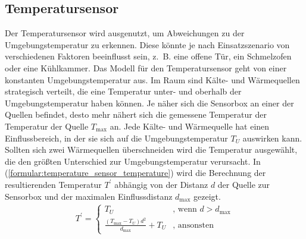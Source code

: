 \subsection{Temperatursensor}
Der Temperatursensor wird ausgenutzt, um Abweichungen zu der Umgebungstemperatur zu erkennen.
Diese könnte je nach Einsatzszenario von verschiedenen Faktoren beeinflusst sein, z.~B. eine offene Tür, ein Schmelzofen oder eine Kühlkammer.
\newline
\newline
Das Modell für den Temperatursensor geht von einer konstanten Umgebungstemperatur aus.
Im Raum sind Kälte- und Wärmequellen strategisch verteilt, die eine Temperatur unter- und oberhalb der Umgebungstemperatur haben können.
Je näher sich die Sensorbox an einer der Quellen befindet, desto mehr nähert sich die gemessene Temperatur der Temperatur der Quelle $T_{\max}$ an.
\newline
\newline
Jede Kälte- und Wärmequelle hat einen Einflussbereich, in der sie sich auf die Umgebungstemperatur $T_U$ auswirken kann.
Sollten sich zwei Wärmequellen überschneiden wird die Temperatur ausgewählt, die den größten Unterschied zur Umgebungstemperatur verursacht.
In (\ref{formular:temperature_sensor_temperature}) wird die Berechnung der resultierenden Temperatur $T^{\prime}$ abhängig von der Distanz $d$ der
Quelle zur Sensorbox und der maximalen Einflussdistanz $d_{\max}$ gezeigt.
\begin{align}
    \label{formular:temperature_sensor_temperature}
    T^{\prime} = \begin{cases}
                     T_U & \text{, wenn } d > d_{\max} \\
                     \frac{(T_{\max} - T_U)d^2}{d_{\max}} + T_U & \text{, ansonsten}
    \end{cases}
\end{align}

